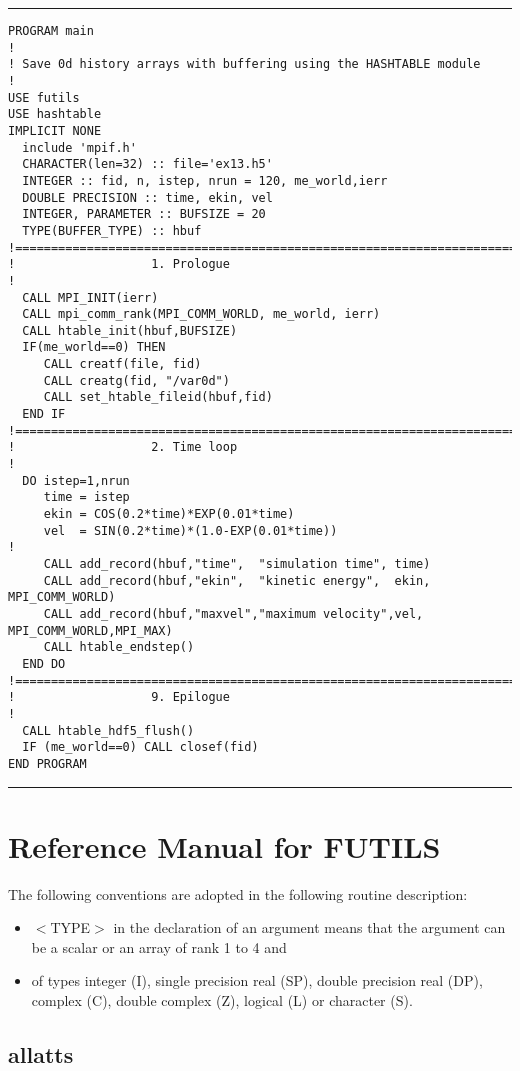 \documentclass[a4paper]{article}
\begin{document}
\addvspace{\medskipamount}
\nopagebreak\hrule
\begin{verbatim}
PROGRAM main
!
! Save 0d history arrays with buffering using the HASHTABLE module
!
USE futils
USE hashtable
IMPLICIT NONE
  include 'mpif.h'
  CHARACTER(len=32) :: file='ex13.h5'
  INTEGER :: fid, n, istep, nrun = 120, me_world,ierr
  DOUBLE PRECISION :: time, ekin, vel
  INTEGER, PARAMETER :: BUFSIZE = 20
  TYPE(BUFFER_TYPE) :: hbuf
!===========================================================================
!                   1. Prologue
!
  CALL MPI_INIT(ierr)
  CALL mpi_comm_rank(MPI_COMM_WORLD, me_world, ierr)
  CALL htable_init(hbuf,BUFSIZE)
  IF(me_world==0) THEN
     CALL creatf(file, fid)
     CALL creatg(fid, "/var0d")
     CALL set_htable_fileid(hbuf,fid)
  END IF
!===========================================================================
!                   2. Time loop
!
  DO istep=1,nrun
     time = istep
     ekin = COS(0.2*time)*EXP(0.01*time)
     vel  = SIN(0.2*time)*(1.0-EXP(0.01*time))
!
     CALL add_record(hbuf,"time",  "simulation time", time)
     CALL add_record(hbuf,"ekin",  "kinetic energy",  ekin, MPI_COMM_WORLD)
     CALL add_record(hbuf,"maxvel","maximum velocity",vel,  MPI_COMM_WORLD,MPI_MAX)
     CALL htable_endstep()
  END DO
!===========================================================================
!                   9. Epilogue
!
  CALL htable_hdf5_flush()
  IF (me_world==0) CALL closef(fid)
END PROGRAM
\end{verbatim}
\nopagebreak\hrule
\addvspace{\medskipamount}





\section{Reference Manual for FUTILS}

The following conventions are adopted in the following routine description:
\begin{itemize}
\item  $<$TYPE$>$ in the declaration of an argument means that the argument can
be a scalar or an array of rank 1 to 4 and
\item  of types integer (I), single precision real (SP), double precision real
(DP), complex (C), double complex (Z), logical (L) or character (S).
\end{itemize}





\subsection{allatts}
\end{document}
